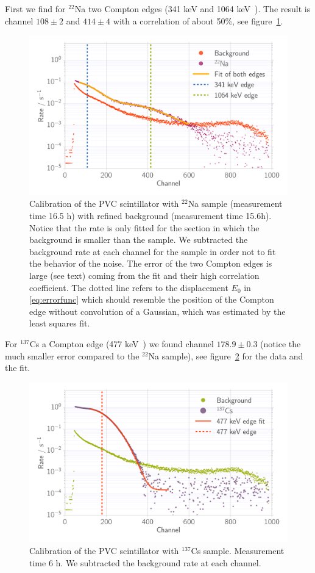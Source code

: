 First we find for $^{22}$Na two Compton edges (341 keV and
1064 keV~\cite{nist}). The result is
channel $108 \pm 2$ and $414 \pm 4$ with a correlation of about 50\%, see
figure~\ref{fig:calib_ps_na}.

\begin{figure}[htpb]
    \centering
    \includegraphics[width=0.9\linewidth]{./analysis/figures/calib_ps_na}
    \caption{Calibration of the PVC scintillator with
        $^{22}$Na sample (measurement time
    16.5 h) with refined background (measurement time 15.6h).
    Notice that the rate is 
    only fitted for the section in which the background is
    smaller than the sample. We
    subtracted the background rate at each channel
    for the sample in order not to fit the 
    behavior of the noise. The error of the two
    Compton edges is large (see text) coming
    from the fit and their high correlation coefficient. The 
dotted line refers to the displacement $E_0$ in \eqref{eq:errorfunc} which should resemble the position of the Compton
edge without convolution of a Gaussian, which was estimated
by the least squares fit.}
\label{fig:calib_ps_na}
\end{figure}
For $^{137}$Cs a Compton edge (477 keV~\cite{nist})
we found channel $178.9 \pm 0.3$ 
(notice the much smaller error compared to the $^{22}$Na sample), 
see figure~\ref{fig:calib_ps_cs} for the data and the fit.
\begin{figure}[htpb]
    \centering
    \includegraphics[width=0.9\linewidth]{./analysis/figures/calib_ps_cs}
    \caption{Calibration of the PVC scintillator with $^{137}$Cs sample. Measurement time
    6 h. We subtracted the background rate at each channel. }
\label{fig:calib_ps_cs}
\end{figure}

